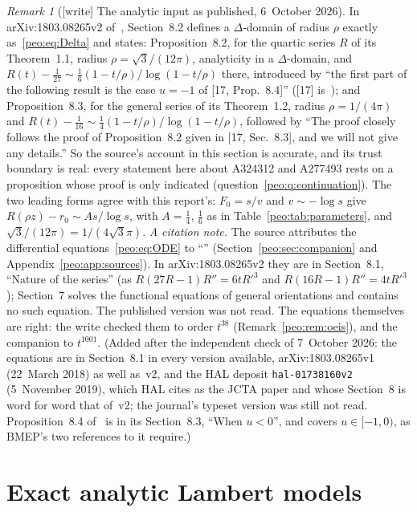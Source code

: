 \documentclass[11pt]{article}
\numberwithin{equation}{section}
\theoremstyle{remark}\newtheorem{remark}[theorem]{Remark}
\newcommand{\file}[1]{\nolinkurl{#1}}
\begin{document}
\begin{remark}[{[write]} The analytic input as published, 6~October 2026]\label{peo:rem:input}
In arXiv:1803.08265v2 of~\cite{BMEP}, Section~8.2 defines a
$\Delta$-domain of radius $\rho$ exactly as~\eqref{peo:eq:Delta} and states:
Proposition~8.2, for the quartic series $R$ of its Theorem~1.1, radius
$\rho=\sqrt3/(12\pi)$, analyticity in a $\Delta$-domain, and
$R(t)-\tfrac1{27}\sim\tfrac16(1-t/\rho)/\log(1-t/\rho)$ there, introduced by
``the first part of the following result is the case $u=-1$ of [17,
Prop.~8.4]'' ([17] is~\cite{BC}); and Proposition~8.3, for the general
series of its Theorem~1.2, radius $\rho=1/(4\pi)$ and
$R(t)-\tfrac1{16}\sim\tfrac14(1-t/\rho)/\log(1-t/\rho)$, followed by ``The
proof closely follows the proof of Proposition~8.2 given in [17, Sec.~8.3],
and we will not give any details.'' So the source's account in this
section is accurate, and its trust boundary is real: every statement here
about A324312 and A277493 rests on a proposition whose proof is only
indicated (question~\ref{peo:q:continuation}). The two leading forms agree
with this report's: $F_0=s/v$ and $v\sim-\log s$ give
$R(\rho z)-r_0\sim As/\log s$, with $A=\tfrac14$, $\tfrac16$ as in
Table~\ref{peo:tab:parameters}, and $\sqrt3/(12\pi)=1/(4\sqrt3\pi)$.
\emph{A citation note.} The source attributes the differential
equations~\eqref{peo:eq:ODE} to ``\cite[Section~7]{BMEP}''
(Section~\ref{peo:sec:companion} and Appendix~\ref{peo:app:sources}). In
arXiv:1803.08265v2 they are in Section~8.1, ``Nature of the series'' (as
$R(27R-1)R''=6tR'^3$ and $R(16R-1)R''=4tR'^3$); Section~7 solves the
functional equations of general orientations and contains no such
equation. The published version was not read. The equations themselves are
right: the write checked them to order $t^{38}$
(Remark~\ref{peo:rem:oeis}), and the companion to $t^{1001}$.
\textup{(Added after the independent check of 7~October 2026: the equations
are in Section~8.1 in every version available, arXiv:1803.08265v1 (22~March
2018) as well as~v2, and the HAL deposit \file{hal-01738160v2} (5~November
2019), which HAL cites as the JCTA paper and whose Section~8 is word for
word that of~v2; the journal's typeset version was still not read.
Proposition~8.4 of~\cite{BC} is in its Section~8.3, ``When $u<0$'', and
covers $u\in[-1,0)$, as BMEP's two references to it require.)}
\end{remark}

\section{Exact analytic Lambert models}\label{peo:sec:models}
\end{document}
